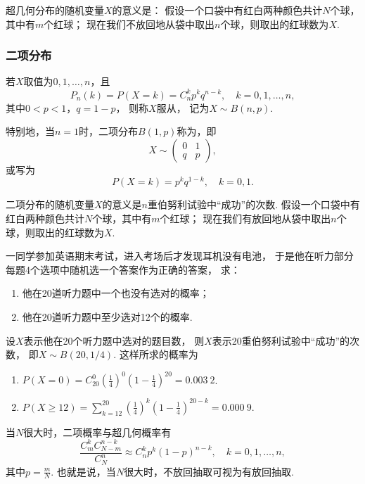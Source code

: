超几何分布的随机变量\(X\)的意义是：
假设一个口袋中有红白两种颜色共计\(N\)个球，其中有\(m\)个红球；
现在我们不放回地从袋中取出\(n\)个球，则取出的红球数为\(X\).

\subsubsection{二项分布}
\begin{definition}
若\(X\)取值为\(0,1,\dotsc,n\)，且\begin{equation}
P_n(k) = P(X=k) = C_n^k p^k q^{n-k}, \quad k=0,1,\dotsc,n,
\end{equation}其中\(0 < p < 1\)，\(q = 1-p\)，
则称\(X\)服从，
记为\(X \sim B(n,p)\).

特别地，当\(n = 1\)时，二项分布\(B(1,p)\)称为，即\[
X \sim \begin{pmatrix} 0 & 1 \\ q & p \end{pmatrix},
\]或写为\[
P(X=k) = p^k q^{1-k}, \quad k=0,1.
\]
\end{definition}

二项分布的随机变量\(X\)的意义是\(n\)重伯努利试验中“成功”的次数.
假设一个口袋中有红白两种颜色共计\(N\)个球，其中有\(m\)个红球；
现在我们有放回地从袋中取出\(n\)个球，则取出的红球数为\(X\).

\begin{example}
一同学参加英语期末考试，进入考场后才发现耳机没有电池，
于是他在听力部分每题4个选项中随机选一个答案作为正确的答案，
求：\begin{enumerate}
	\item 他在20道听力题中一个也没有选对的概率；
	\item 他在20道听力题中至少选对12个的概率.
\end{enumerate}
\begin{solution}
设\(X\)表示他在20个听力题中选对的题目数，
则\(X\)表示20重伯努利试验中“成功”的次数，
即\(X \sim B(20, 1/4)\).
这样所求的概率为\begin{enumerate}
	\item \(P(X=0) = C_{20}^0 \left(\frac14\right)^0 \left(1-\frac14\right)^{20} = 0.003\ 2\).
	\item \(P(X \geq 12) = \sum_{k=12}^{20} \left(\frac14\right)^k \left(1-\frac14\right)^{20-k} = 0.000\ 9\).
\end{enumerate}
\end{solution}
\end{example}

\begin{theorem}
当\(N\)很大时，二项概率与超几何概率有\[
	\frac{C_m^k C_{N-m}^{n-k}}{C_N^n}
	\approx
	C_n^k p^k (1-p)^{n-k}, \quad k=0,1,\dotsc,n,
\]
其中\(p=\frac{m}{N}\).
也就是说，当\(N\)很大时，不放回抽取可视为有放回抽取.
\end{theorem}

